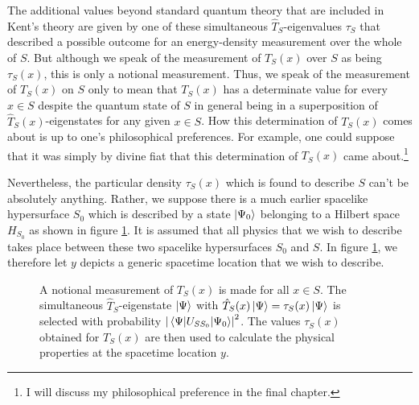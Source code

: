 The additional values beyond standard quantum theory that are included in Kent's theory are given by one of these simultaneous $\hat{T}_S$-eigenvalues $\tau_S$ that described a possible outcome for an energy-density measurement over the whole of $S$.  But although we speak of the measurement of $T_S(x)$ over $S$ as being $\tau_S(x)$, this is only a notional measurement. Thus, we speak of the measurement of  $T_S(x)$ on $S$ only to mean that $T_S(x)$ has a determinate value for every $x\in S$ despite the quantum state of $S$ in general being in a superposition of $\hat{T}_S(x)$-eigenstates for any given $x\in S$. How this determination of $T_S(x)$ comes about is up to one's philosophical preferences. For example, one could suppose that it was simply by divine fiat that this determination  of $T_S(x)$ came about.\footnote{I will discuss my philosophical preference in the final chapter.} 

Nevertheless, the particular density $\tau_S(x)$ which is found to describe $S$ can't be absolutely anything. Rather, we suppose there is a much earlier spacelike hypersurface $S_0$ which is described by a state $\ket{\Psi_0}$ belonging to a Hilbert space $H_{S_0}$ as shown in figure \ref{S1}.  It is assumed that all physics that we wish to describe takes place between these two spacelike hypersurfaces $S_0$ and $S$. In figure \ref{S1}, we therefore let $y$ depicts a generic spacetime location that we wish to describe. 

 \begin{figure}[ht!]
\captionsetup{justification=justified}
\centering



\vspace*{2px}
\caption{A notional measurement of $T_S(x)$ is made for all $x\in S$. The simultaneous  $\hat{T}_S$-eigenstate $\ket{\Psi}$ with $\hat{T}_S(x)\ket{\Psi}=\tau_S(x)\ket{\Psi}$ is selected with probability $\abs{\mel{\Psi}{U_{SS_0}}{\Psi_0}}^2$. The values $\tau_S(x)$ obtained for $T_S(x)$ are then used to calculate the physical properties at the spacetime location $y$.  }
\label{S1}
\end{figure} 
\vspace*{-12px}

